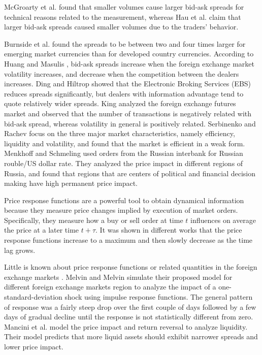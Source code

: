McGroarty et al. \cite{micro_eff} found that smaller volumes cause larger
bid-ask spreads for technical reasons related to the measurement, whereas Hau
et al. \cite{eur_change_forex,eur_int_curr} claim that larger bid-ask spreads
caused smaller volumes due to the traders' behavior.

Burnside et al. \cite{curr_speculation} found the spreads to be between two and
four times larger for emerging market currencies than for developed country
currencies. According to Huang and Masulis \cite{spread_competition}, bid-ask
spreads increase when the foreign exchange market volatility increases, and
decrease when the competition between the dealers increases. Ding and Hiltrop
\cite{electronic_forex} showed that the Electronic Broking Services (EBS)
reduces spreads significantly, but dealers with information advantage tend to
quote relatively wider spreads. King \cite{spread_futures} analyzed the foreign
exchange futures market and observed that the number of transactions is
negatively related with bid-ask spread, whereas volatility in general is
positively related. Serbinenko and Rachev \cite{intraday_forex} focus on the
three major market characteristics, namely efficiency, liquidity and
volatility, and found that the market is efficient in a weak form. Menkhoff and
Schmeling \cite{local_forex} used orders from the Russian interbank for Russian
rouble/US dollar rate. They analyzed the price impact in different regions of
Russia, and found that regions that are centers of political and financial
decision making have high permanent price impact.

Price response functions are a powerful tool to obtain dynamical information
because they measure price changes implied by execution of market orders.
Specifically, they measure how a buy or sell order at time $t$ influences on
average the price at a later time $t + \tau$. It was shown in different works
\cite{components_spread_tokyo,dissecting_cross,r_walks_liquidity,subtle_nature,Bouchaud_2004,theory_market_impact,my_paper_response_financial,Wang_2016_avg,Wang_2016_cross}
that the price response functions increase to a maximum and then slowly
decrease as the time lag grows.

Little is known about price response functions or related quantities in the
foreign exchange markets
\cite{forex_liquidity,forex_volatility,response_funct_fx}. Melvin and Melvin
\cite{forex_volatility} simulate their proposed model for different foreign
exchange markets region to analyze the impact of a one-standard-deviation shock
using impulse response functions. The general pattern of response was a fairly
steep drop over the first couple of days followed by a few days of gradual
decline until the response is not statistically different from zero. Mancini et
al. \cite{forex_liquidity} model the price impact and return reversal to
analyze liquidity. Their model predicts that more liquid assets should exhibit
narrower spreads and lower price impact.

